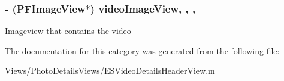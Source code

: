 \subsubsection[{video\+Image\+View}]{\setlength{\rightskip}{0pt plus 5cm}-\/ (P\+F\+Image\+View$\ast$) video\+Image\+View\hspace{0.3cm}{\ttfamily [read]}, {\ttfamily [write]}, {\ttfamily [nonatomic]}, {\ttfamily [strong]}}\label{category_e_s_video_details_header_view_07_08_a4486f657dd26c68c6dd89e2a3bea9a34}
Imageview that contains the video 

The documentation for this category was generated from the following file\+:\begin{DoxyCompactItemize}
\item 
Views/\+Photo\+Details\+Views/E\+S\+Video\+Details\+Header\+View.\+m\end{DoxyCompactItemize}
